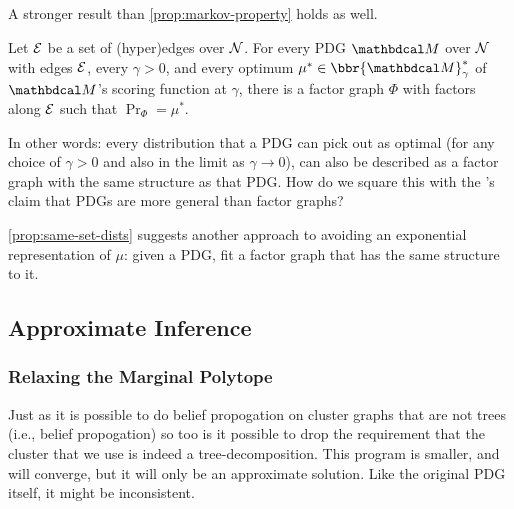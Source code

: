 \documentclass[twoside]{article}
\begin{document}
\subsection{}
A stronger result than \cref{prop:markov-property} holds as well.
\begin{prop}\label{prop:same-set-dists}
    Let $\mathcal E$ be a set of (hyper)edges over $\mathcal N$. 
    For every PDG $\dg M$ over $\mathcal N$ with edges $\mathcal E$, every $\gamma > 0$, and every optimum $\mu^* \in \bbr{\dg M}_\gamma^*$ of $\dg M$'s scoring function at $\gamma$, 
    there is a factor graph $\Phi$ with factors along $\mathcal E$ such that $\Pr_\Phi = \mu^*$. 
\end{prop}

In other words: every distribution that a PDG can pick out as optimal (for any choice of $\gamma > 0$ and also in the limit as $\gamma \to 0$), can also be described as a factor graph with the same structure as that PDG.
How do we square this with the \citeauthor{pdg-aaai}'s claim that PDGs are more general than factor graphs?



\cref{prop:same-set-dists} suggests another approach to avoiding an exponential representation of $\mu$: given a PDG, fit a factor graph that has the same structure to it. 

\subsection{Approximate Inference}
\subsubsection{Relaxing the Marginal Polytope}
Just as it is possible to do belief propogation on cluster graphs that are not trees (i.e., belief propogation)
so too is it possible to drop the requirement that the cluster that we use is indeed a tree-decomposition.
This program is smaller, and will converge, but it will only be an approximate solution. 
Like the original PDG itself, it might be inconsistent. 
\end{document}
